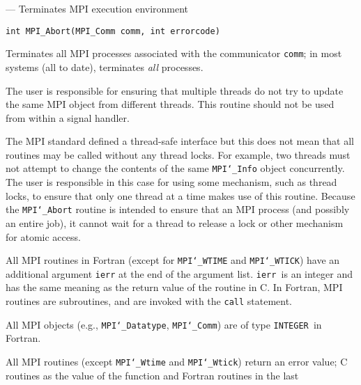 \startmanpage
{}
--- Terminates MPI execution environment 
\startvb\begin{verbatim}
int MPI_Abort(MPI_Comm comm, int errorcode)

\end{verbatim}
\endvb

\par
{}
Terminates all MPI processes associated with the communicator {\tt comm}; in
most systems (all to date), terminates {\em all} processes.
\par
{}
\par
The user is responsible for ensuring that multiple threads do not try to
update the same MPI object from different threads.  This routine should
not be used from within a signal handler.
\par
The MPI standard defined a thread-safe interface but this does not
mean that all routines may be called without any thread locks.  For
example, two threads must not attempt to change the contents of the
same {\tt MPI{\tt \char`\_}Info} object concurrently.  The user is responsible in this
case for using some mechanism, such as thread locks, to ensure that
only one thread at a time makes use of this routine.
Because the {\tt MPI{\tt \char`\_}Abort} routine is intended to ensure that an MPI
process (and possibly an entire job), it cannot wait for a thread to
release a lock or other mechanism for atomic access.
\par
{}
All MPI routines in Fortran (except for {\tt MPI{\tt \char`\_}WTIME} and {\tt MPI{\tt \char`\_}WTICK}) have
an additional argument {\tt ierr} at the end of the argument list.  {\tt ierr
}is an integer and has the same meaning as the return value of the routine
in C.  In Fortran, MPI routines are subroutines, and are invoked with the
{\tt call} statement.
\par
All MPI objects (e.g., {\tt MPI{\tt \char`\_}Datatype}, {\tt MPI{\tt \char`\_}Comm}) are of type {\tt INTEGER
}in Fortran.
\par
{}
\par
All MPI routines (except {\tt MPI{\tt \char`\_}Wtime} and {\tt MPI{\tt \char`\_}Wtick}) return an error value;
C routines as the value of the function and Fortran routines in the last
